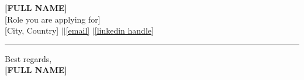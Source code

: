 \documentclass[10pt,a4paper]{article}
\begin{document}
\begin{center}
  {\LARGE\bfseries [FULL NAME]} \\[3pt]
  {\large [Role you are applying for] %
  } \\[6pt]
  {\small [City, Country] \quad$|$\quad [Phone] \quad$|$\quad \href{mailto:[email]}{[email]} \quad$|$\quad \href{[LinkedIn URL]}{[linkedin handle]}}
\end{center}
\vspace{2pt}
{\color{rulecolor}\rule{\textwidth}{1.5pt}}
\vspace{10pt}

\noindent %
\vspace{8pt}

\noindent %
\vspace{8pt}

\noindent %
\vspace{4pt}


\vspace{10pt}
\noindent Best regards, \\[3pt]
\textbf{[FULL NAME]}
\end{document}
